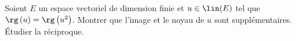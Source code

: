 \begin{enonce}
\begin{exercise}[ID={RMS123 E961, CCP PSI},subtitle={},tags={}, difficulty={0}]
Soient $E$ un espace vectoriel de dimension finie et $u\in\lin(E)$ tel que $\rg\left( u \right)=\rg\left( u^2 \right)$.
Montrer que l'image et le noyau de $u$ sont supplémentaires.
Étudier la réciproque.
\end{exercise}
\begin{solution}
\end{solution}
\end{enonce}
